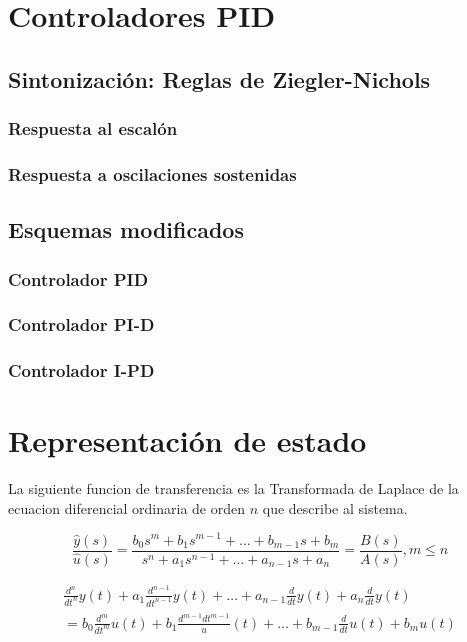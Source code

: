 \newpage
\section{Controladores PID}
\subsection{Sintonización: Reglas de Ziegler-Nichols}
\subsubsection{Respuesta al escalón}
\subsubsection{Respuesta a oscilaciones sostenidas}
\subsection{Esquemas modificados}
\subsubsection{Controlador PID}
\subsubsection{Controlador PI-D}
\subsubsection{Controlador I-PD}

\newpage
\section{Representación de estado}

La siguiente funcion de transferencia es la Transformada de Laplace de la ecuacion diferencial ordinaria de orden $n$ que describe al sistema.

\begin{equation}
\frac{\hat{y}(s)}{\hat{u}(s)} = \frac{b_0 s^m + b_1 s^{m-1} + ... + b_{m-1} s + b_m}{s^n + a_1 s^{n-1} + ... + a_{n-1} s + a_n} = \frac{B(s)}{A(s)}, m \le n
\end{equation}

\begin{multline}
\frac{d^n}{dt^n} y(t) + a_1 \frac{d^{n-1}}{dt^{n-1}} y(t) + \dots + a_{n-1} \frac{d}{dt} y(t) + a_n \frac{d}{dt} y(t) \\ = b_0 \frac{d^m}{dt^m} u(t) + b_1 \frac{d^{m-1}{dt^{m-1}}} u(t) + \dots + b_{m-1} \frac{d}{dt} u(t) + b_{m} u(t)
\end{multline}


